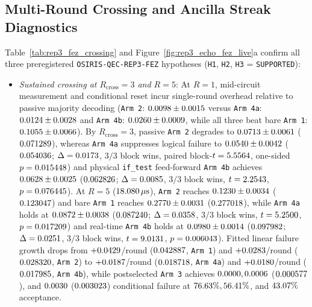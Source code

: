 \documentclass[aps,prx,twocolumn,superscriptaddress,nofootinbib]{revtex4-2}
\begin{document}
\subsection{Multi-Round Crossing and Ancilla Streak Diagnostics}
Table~\ref{tab:rep3_fez_crossing} and Figure~\ref{fig:rep3_echo_fez_live}a confirm all three preregistered \texttt{OSIRIS-QEC-REP3-FEZ} hypotheses (\texttt{H1}, \texttt{H2}, \texttt{H3} = \texttt{SUPPORTED}):
\begin{itemize}
  \item \emph{Sustained crossing at $R_{\mathrm{cross}} = 3$ and $R = 5$}: At $R = 1$, mid-circuit measurement and conditional reset incur single-round overhead relative to passive majority decoding (\texttt{Arm 2}: $0.0098 \pm 0.0015$ versus \texttt{Arm 4a}: $0.0124 \pm 0.0028$ and \texttt{Arm 4b}: $0.0260 \pm 0.0009$, while all three beat bare \texttt{Arm 1}: $0.1055 \pm 0.0066$). By $R_{\mathrm{cross}} = 3$, passive \texttt{Arm 2} degrades to $0.0713 \pm 0.0061$ ($0.071289$), whereas \texttt{Arm 4a} suppresses logical failure to $0.0540 \pm 0.0042$ ($0.054036$; $\Delta = 0.0173$, $3/3$ block wins, paired block-$t = 5.5564$, one-sided $p = 0.015448$) and physical \texttt{if\_test} feed-forward \texttt{Arm 4b} achieves $0.0628 \pm 0.0025$ ($0.062826$; $\Delta = 0.0085$, $3/3$ block wins, $t = 2.2543$, $p = 0.076445$). At $R = 5$ ($18.080\,\mu\mathrm{s}$), \texttt{Arm 2} reaches $0.1230 \pm 0.0034$ ($0.123047$) and bare \texttt{Arm 1} reaches $0.2770 \pm 0.0031$ ($0.277018$), while \texttt{Arm 4a} holds at $0.0872 \pm 0.0038$ ($0.087240$; $\Delta = 0.0358$, $3/3$ block wins, $t = 5.2500$, $p = 0.017209$) and real-time \texttt{Arm 4b} holds at $0.0980 \pm 0.0014$ ($0.097982$; $\Delta = 0.0251$, $3/3$ block wins, $t = 9.0131$, $p = 0.006043$). Fitted linear failure growth drops from $+0.0429$/round ($0.042887$, \texttt{Arm 1}) and $+0.0283$/round ($0.028320$, \texttt{Arm 2}) to $+0.0187$/round ($0.018718$, \texttt{Arm 4a}) and $+0.0180$/round ($0.017985$, \texttt{Arm 4b}), while postselected \texttt{Arm 3} achieves $0.0000, 0.0006$ ($0.000577$), and $0.0030$ ($0.003023$) conditional failure at $76.63\%, 56.41\%$, and $43.07\%$ acceptance.

\end{itemize}
\end{document}
